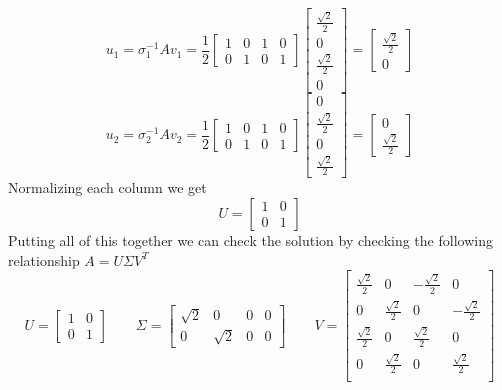 \documentclass{article}
\begin{document}
$$u_1 = \sigma_1^{-1}Av_1 =
\frac{1}{2}
\begin{bmatrix}
1 & 0 & 1 & 0 \\
0 & 1 & 0 & 1
\end{bmatrix}
\begin{bmatrix}
\frac{\sqrt{2}}{2}\\
0\\
\frac{\sqrt{2}}{2}\\
0
\end{bmatrix}
=
\begin{bmatrix}
\frac{\sqrt{2}}{2} \\
0
\end{bmatrix}
$$
$$u_2 = \sigma_2^{-1}Av_2 =
\frac{1}{2}
\begin{bmatrix}
1 & 0 & 1 & 0 \\
0 & 1 & 0 & 1
\end{bmatrix}
\begin{bmatrix}
0\\
\frac{\sqrt{2}}{2}\\
0\\
\frac{\sqrt{2}}{2}
\end{bmatrix}
=
\begin{bmatrix}
0 \\
\frac{\sqrt{2}}{2}
\end{bmatrix}
$$
Normalizing each column we get
$$
U
=
\begin{bmatrix}
1 & 0 \\
0 & 1
\end{bmatrix}
$$
Putting all of this together we can check the solution by checking the following relationship $A = U\Sigma V^T$
$$
U
=
\begin{bmatrix}
1 & 0 \\
0 & 1
\end{bmatrix}
\qquad
\Sigma
=
\begin{bmatrix}
\sqrt{2} & 0 & 0 & 0 \\
0 & \sqrt{2} & 0 & 0
\end{bmatrix}
\qquad
V
=
\begin{bmatrix}
\frac{\sqrt{2}}{2} & 0 & -\frac{\sqrt{2}}{2} & 0 \\
0 & \frac{\sqrt{2}}{2} & 0 & -\frac{\sqrt{2}}{2} \\
\frac{\sqrt{2}}{2} & 0 & \frac{\sqrt{2}}{2} & 0 \\
0 & \frac{\sqrt{2}}{2} & 0 & \frac{\sqrt{2}}{2} \\
\end{bmatrix}
$$
\end{document}

